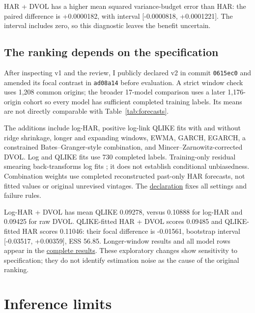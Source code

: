 \documentclass[10pt,a4paper]{article}
\newcommand{\RiskLossMean}{+0.0000182}
\newcommand{\RiskLossLower}{-0.0000818}
\newcommand{\RiskLossUpper}{+0.0001221}
\newcommand{\VTwoN}{1{,}176}
\newcommand{\VTwoModels}{17}
\newcommand{\VTwoWindowN}{1{,}208}
\newcommand{\VTwoRaw}{0.09425}
\newcommand{\VTwoLog}{0.10888}
\newcommand{\VTwoLogAug}{0.09278}
\newcommand{\VTwoQHar}{0.11046}
\newcommand{\VTwoQAug}{0.09485}
\newcommand{\VTwoFocal}{-0.01561}
\newcommand{\VTwoLower}{-0.03517}
\newcommand{\VTwoUpper}{+0.00359}
\newcommand{\VTwoESS}{56.85}
\newcommand{\VTwoLabels}{730}
\newcommand{\VTwoCommit}{0615ec0}
\newcommand{\VTwoAmendment}{ad08a14}
\begin{document}
HAR + DVOL has a higher mean squared variance-budget error than HAR: the paired difference is \RiskLossMean{}, with interval [\RiskLossLower{}, \RiskLossUpper{}]. The interval includes zero, so this diagnostic leaves the benefit uncertain.


\subsection{The ranking depends on the specification}

After inspecting v1 and the review, I publicly declared v2 in commit \texttt{\VTwoCommit{}} and amended its focal contrast in \texttt{\VTwoAmendment{}} before evaluation. A strict window check uses \VTwoWindowN{} common origins; the broader \VTwoModels{}-model comparison uses a later \VTwoN{}-origin cohort so every model has sufficient completed training labels. Its means are not directly comparable with Table~\ref{tab:forecasts}.

The additions include log-HAR, positive log-link QLIKE fits with and without ridge shrinkage, longer and expanding windows, EWMA, GARCH, EGARCH, a constrained Bates--Granger-style combination, and Mincer--Zarnowitz-corrected DVOL. Log and QLIKE fits use \VTwoLabels{} completed labels. Training-only residual smearing back-transforms log fits \citep{duan}; it does not establish conditional unbiasedness. Combination weights use completed reconstructed past-only HAR forecasts, not fitted values or original unrevised vintages. The \href{https://github.com/50kfunded/implied-odds/blob/main/protocol/exploratory-review-v2.json}{declaration} fixes all settings and failure rules.

Log-HAR + DVOL has mean QLIKE \VTwoLogAug{}, versus \VTwoLog{} for log-HAR and \VTwoRaw{} for raw DVOL. QLIKE-fitted HAR + DVOL scores \VTwoQAug{} and QLIKE-fitted HAR scores \VTwoQHar{}: their focal difference is \VTwoFocal{}, bootstrap interval [\VTwoLower{}, \VTwoUpper{}], ESS \VTwoESS{}. Longer-window results and all model rows appear in the \href{https://github.com/50kfunded/implied-odds/blob/main/report/v2-results.md}{complete results}. These exploratory changes show sensitivity to specification; they do not identify estimation noise as the cause of the original ranking.

\section{Inference limits}
\label{sec:inference}
\end{document}

